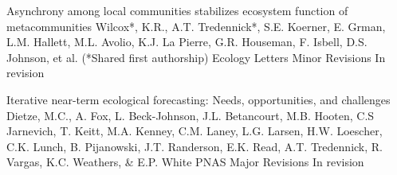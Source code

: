 

\begin{pubentries}

  \pubentry
    {Asynchrony among local communities stabilizes ecosystem function of metacommunities} %
    {Wilcox*, K.R., A.T. Tredennick*, S.E. Koerner, E. Grman, L.M. Hallett, M.L. Avolio, K.J. La Pierre, G.R. Houseman, F. Isbell, D.S. Johnson, et al. (*Shared first authorship)} %
    {Ecology Letters} %
    {Minor Revisions} %
    {In revision} %

  \pubentry
    {Iterative near-term ecological forecasting: Needs, opportunities, and challenges} %
    {Dietze, M.C., A. Fox, L. Beck-Johnson, J.L. Betancourt, M.B. Hooten, C.S Jarnevich, T. Keitt, M.A. Kenney, C.M. Laney, L.G. Larsen, H.W. Loescher, C.K. Lunch, B. Pijanowski, J.T. Randerson, E.K. Read, A.T. Tredennick, R. Vargas, K.C. Weathers, \& E.P. White} %
    {PNAS} %
    {Major Revisions} %
    {In revision} %

\end{pubentries}
